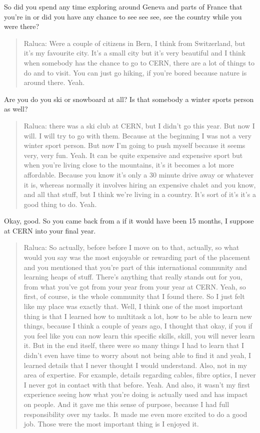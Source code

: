 \documentclass[
]{book}
\begin{document}
So did you spend any time exploring around Geneva and parts of France that you're in or did you have any chance to see see see, see the country while you were there?

\begin{quote}
Raluca: Were a couple of citizens in Bern, I think from Switzerland, but it's my favourite city. It's a small city but it's very beautiful and I think when somebody has the chance to go to CERN, there are a lot of things to do and to visit. You can just go hiking, if you're bored because nature is around there. Yeah.
\end{quote}

Are you do you ski or snowboard at all? Is that somebody a winter sports person as well?

\begin{quote}
Raluca: there was a ski club at CERN, but I didn't go this year. But now I will. I will try to go with them. Because at the beginning I was not a very winter sport person. But now I'm going to push myself because it seems very, very fun. Yeah. It can be quite expensive and expensive sport but when you're living close to the mountains, it's it becomes a lot more affordable. Because you know it's only a 30 minute drive away or whatever it is, whereas normally it involves hiring an expensive chalet and you know, and all that stuff, but I think we're living in a country. It's sort of it's it's a good thing to do. Yeah.
\end{quote}

Okay, good. So you came back from a if it would have been 15 months, I suppose at CERN into your final year.

\begin{quote}
Raluca: So actually, before before I move on to that, actually, so what would you say was the most enjoyable or rewarding part of the placement and you mentioned that you're part of this international community and learning heaps of stuff. There's anything that really stands out for you, from what you've got from your year from your year at CERN. Yeah, so first, of course, is the whole community that I found there. So I just felt like my place was exactly that. Well, I think one of the most important thing is that I learned how to multitask a lot, how to be able to learn new things, because I think a couple of years ago, I thought that okay, if you if you feel like you can now learn this specific skills, skill, you will never learn it. But in the end itself, there were so many things I had to learn that I didn't even have time to worry about not being able to find it and yeah, I learned details that I never thought I would understand. Also, not in my area of expertise. For example, details regarding cables, fibre optics, I never I never got in contact with that before. Yeah. And also, it wasn't my first experience seeing how what you're doing is actually used and has impact on people. And it gave me this sense of purpose, because I had full responsibility over my tasks. It made me even more excited to do a good job. Those were the most important thing is I enjoyed it.
\end{quote}
\end{document}
